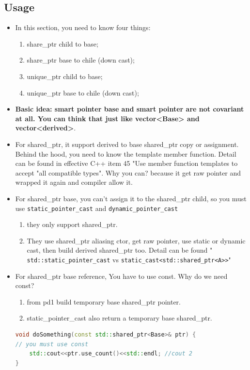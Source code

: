 \documentclass[a4paper,12pt,twoside]{book}
\begin{document}
\subsection{Usage}
\begin{itemize}
\item In this section, you need to know four things:
\begin{enumerate}
\item share\_ptr child to base;
\item share\_ptr base to chile (down cast);
\item unique\_ptr child to base;
\item unique\_ptr base to chile (down cast);
\end{enumerate}

		\item \textbf{Basic idea: smart pointer base and smart pointer are not covariant at all. You can think that just like vector<Base> and vector<derived>}.

		\item For shared\_ptr, it support derived to base shared\_ptr copy or assignment. Behind the hood, you need to know the template member function. Detail can be found in effective C++ item 45 "Use member function templates to accept "all compatible types". Why you can? because it get raw pointer and wrapped it again and compiler allow it.

		\item  For shared\_ptr base, you can't assign it to the shared\_ptr child, so you must use \texttt{static\_pointer\_cast} and \texttt{dynamic\_pointer\_cast}
		\begin{enumerate}
			\item they only support shared\_ptr.
			\item They use shared\_ptr aliasing ctor, get raw pointer, use static or dynamic cast, then build derived shared\_ptr too. Detail can be found "
			\texttt{std::static\_pointer\_cast} vs \texttt{static\_cast<std::shared\_ptr<A>>}"
		\end{enumerate}

		\item For shared\_ptr base reference, You have to use const. Why do we need const?
		\begin{enumerate}
			\item from pd1 build temporary base shared\_ptr pointer.
			\item static\_pointer\_cast also return a temporary base shared\_ptr.
		\end{enumerate}
\begin{lstlisting}[frame=single, language=c++, mathescape=true]
void doSomething(const std::shared_ptr<Base>& ptr) {
// you must use const
    std::cout<<ptr.use_count()<<std::endl; //cout 2
}


\end{lstlisting}
\end{itemize}
\end{document}
